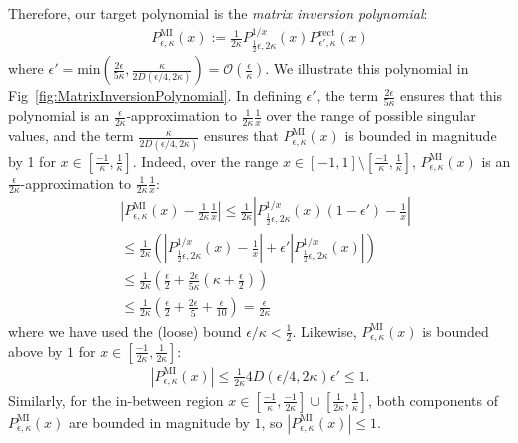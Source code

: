 \documentclass[aps,pra,showpacs,notitlepage,twocolumn,superscriptaddress,nofootinbib]{revtex4-1}
\begin{document}
Therefore, our target polynomial is the \emph{matrix inversion polynomial}: 
\begin{equation}\label{eq:1OverxApprox}
\begin{gathered}
     P^{\text{MI}}_{\epsilon,\kappa}(x) := \frac{1}{2\kappa} P^{1/x}_{\frac{1}{2} \epsilon, 2 \kappa}(x) P^{\text{rect}}_{\epsilon', \kappa}(x)   
\end{gathered}
\end{equation}
where $\epsilon' = \text{min}\left( \frac{2\epsilon}{5\kappa}, \frac{\kappa}{2D(\epsilon/4, 2\kappa)} \right) = \mathcal{O}\left(\frac{\epsilon}{\kappa}\right)$. We illustrate this polynomial in Fig~\ref{fig:MatrixInversionPolynomial}. In defining $\epsilon'$, the term $\frac{2\epsilon}{5\kappa}$ ensures that this polynomial is an $\frac{\epsilon}{2\kappa}$-approximation to $\frac{1}{2 \kappa}\frac{1}{x}$ over the range of possible singular values, and the term $\frac{\kappa}{2D(\epsilon/4, 2\kappa)}$ ensures that $P^{\text{MI}}_{\epsilon,\kappa}(x)$ is bounded in magnitude by 1 for $x\in [\frac{-1}{\kappa}, \frac{1}{\kappa}]$. Indeed, over the range $x \in [-1, 1] \setminus [\frac{-1}{\kappa}, \frac{1}{\kappa}]$, $P^{\text{MI}}_{\epsilon,\kappa}(x)$ is an $\frac{\epsilon}{2\kappa}$-approximation to $\frac{1}{2 \kappa}\frac{1}{x}$:
\begin{equation}
    \begin{split}
        &\left|P^{\text{MI}}_{\epsilon,\kappa}(x) - \frac{1}{2\kappa}\frac{1}{x}\right| 
        \leq \frac{1}{2\kappa} \left|P^{1/x}_{\frac{1}{2} \epsilon, 2 \kappa}(x)(1-\epsilon') - \frac{1}{x} \right| \\
        &\leq \frac{1}{2\kappa}\left( \left|P^{1/x}_{\frac{1}{2} \epsilon , 2 \kappa}(x) - \frac{1}{x} \right|  + \epsilon' \left| P^{1/x}_{\frac{1}{2} \epsilon, 2 \kappa}(x)\right| \right) \\
        &\leq \frac{1}{2\kappa}\left( \frac{\epsilon}{2} + \frac{2\epsilon}{5\kappa} \left(\kappa + \frac{\epsilon}{2} \right) \right) \\ 
        &\leq \frac{1}{2\kappa}\left( \frac{\epsilon}{2} + \frac{2\epsilon}{5} + \frac{\epsilon}{10} \right) 
        = \frac{\epsilon}{2\kappa}
    \end{split}
\end{equation}
where we have used the (loose) bound $\epsilon/\kappa < \frac{1}{2}$. Likewise, $P^{\text{MI}}_{\epsilon,\kappa}(x)$ is bounded above by $1$ for $x \in [\frac{-1}{2\kappa}, \frac{1}{2\kappa}]$:
\begin{equation}
    \begin{gathered}
        \left|P^{\text{MI}}_{\epsilon,\kappa}(x)\right| \leq \frac{1}{2\kappa} 4D\left(\epsilon/4, 2\kappa \right) \epsilon' \leq  1.
    \end{gathered}
\end{equation}
Similarly, for the in-between region $x \in [\frac{-1}{\kappa}, \frac{-1}{2\kappa}] \cup [\frac{1}{2\kappa}, \frac{1}{\kappa}]$, both components of $P^{\text{MI}}_{\epsilon,\kappa}(x)$ are bounded in magnitude by $1$, so $|P^{\text{MI}}_{\epsilon,\kappa}(x)| \leq 1$.
\end{document}

